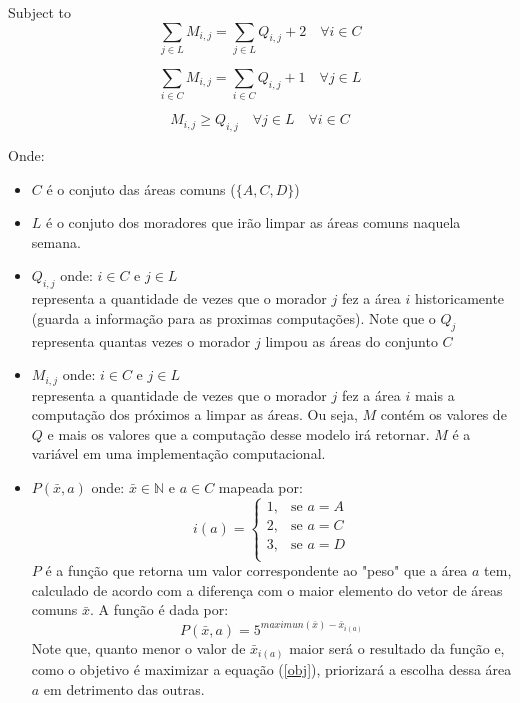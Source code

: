 \documentclass{article}
\begin{document}
    Subject to \\
    \begin{equation} \label{row_r}
        \sum_{j \in L}{M_{i,j}} = \sum_{j \in L}{Q_{i,j}} + 2 \quad \forall i \in C
    \end{equation}

    \begin{equation} \label{columm_r}
        \sum_{i \in C}{M_{i,j}} = \sum_{i \in C}{Q_{i,j}} + 1 \quad \forall j \in L
    \end{equation}

    \begin{equation} \label{quant_r}
        M_{i,j} \geq Q_{i,j} \quad \forall j \in L \quad \forall i \in C
    \end{equation}

    Onde:
    \begin{itemize}
        \item $C$ é o conjuto das áreas comuns ($\{A, C, D\}$)
        \item $L$ é o conjuto dos moradores que irão limpar as áreas comuns
              naquela semana. 
        \item $Q_{i,j}$ onde: $i \in C$ e $j \in L$ \\
              representa a quantidade de vezes que o morador $j$ fez 
              a área $i$ historicamente (guarda a informação para as 
              proximas computações). Note que o $Q_j$ representa quantas
              vezes o morador $j$ limpou as áreas do conjunto $C$
        \item $M_{i,j}$ onde: $i \in C$ e $j \in L$ \\
              representa a quantidade de vezes que o morador $j$ fez a área $i$
              mais a computação dos próximos a limpar as áreas. Ou seja, $M$ contém
              os valores de $Q$ e mais os valores que a computação desse modelo
              irá retornar. $M$ é a variável em uma implementação computacional.
        \item $P(\bar{x},a)$ onde: $\bar{x} \in \mathbb{N}$ e $a \in C$ mapeada por:
              $$i(a)= 
              \begin{cases}
                    1, & \text{se } a = A\\
                    2, & \text{se } a = C\\
                    3, & \text{se } a = D\\
              \end{cases}
              $$
              $P$ é a função que retorna um valor correspondente ao "peso"
              que a área $a$ tem, calculado de acordo com a diferença com o 
              maior elemento do vetor de áreas comuns $\bar{x}$. A função é dada por:
              $$P(\bar{x},a) = 5^{maximun(\bar{x}) - \bar{x}_{i(a)}}$$
              Note que, quanto menor o valor de $\bar{x}_{i(a)}$ maior será o resultado
              da função e, como o objetivo é maximizar a equação (\ref{obj}), 
              priorizará a escolha dessa área $a$ em detrimento das outras.
    \end{itemize}
    
\end{document}
